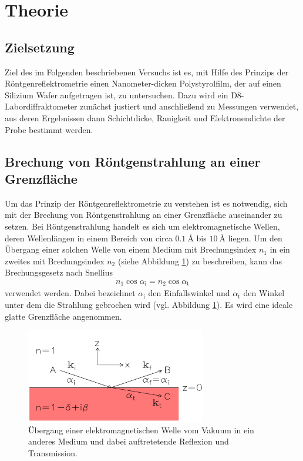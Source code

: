 \section{Theorie}
\label{sec:Theorie}

\subsection{Zielsetzung}
\label{subsec:zielsetzung}
Ziel des im Folgenden beschriebenen Versuchs ist es,
mit Hilfe des Prinzips der Röntgenreflektrometrie
einen Nanometer-dicken Polystyrolfilm, der auf einen Silizium
Wafer aufgetragen ist, zu untersuchen.
Dazu wird ein D8-Labordiffraktometer zunächst justiert und anschließend zu
Messungen verwendet, aus deren Ergebnissen dann Schichtdicke, Rauigkeit und
Elektronendichte der Probe bestimmt werden.


\subsection{Brechung von Röntgenstrahlung an einer Grenzfläche}
\label{subsec:einschicht}
Um das Prinzip der Röntgenreflektrometrie zu verstehen ist es notwendig,
sich mit der Brechung von Röntgenstrahlung an einer Grenzfläche auseinander
zu setzen.
Bei Röntgenstrahlung handelt es sich um elektromagnetische Wellen, deren
Wellenlängen in einem Bereich von circa $\SI{0.1}{\angstrom}$ bis
$\SI{10}{\angstrom}$ liegen.
Um den Übergang einer solchen Welle von einem Medium mit Brechungsindex $n_{1}$
in ein zweites mit Brechungsindex $n_{2}$ (siehe Abbildung \ref{fig:einschicht})
zu beschreiben, kann das Brechungsgesetz nach Snellius
\begin{align}
  n_{1} \cos\alpha_{\text{i}} = n_{2} \cos\alpha_{\text{t}}
  \label{eqn:snellius}
\end{align}
verwendet werden. Dabei bezeichnet $\alpha_{\text{i}}$ den Einfallswinkel
und $\alpha_{\text{t}}$ den Winkel unter dem die Strahlung gebrochen wird
(vgl. Abbildung \ref{fig:einschicht}). Es wird eine ideale glatte Grenzfläche
angenommen. \\

\FloatBarrier
\begin{figure}
  \centering
  \includegraphics[width=0.7\textwidth]{bilder/einschicht.png}
  \caption{Übergang einer elektromagnetischen Welle vom Vakuum in ein
            anderes Medium und dabei auftretetende Reflexion und Transmission.\cite{sample}}
  \label{fig:einschicht}
\end{figure}
\FloatBarrier

